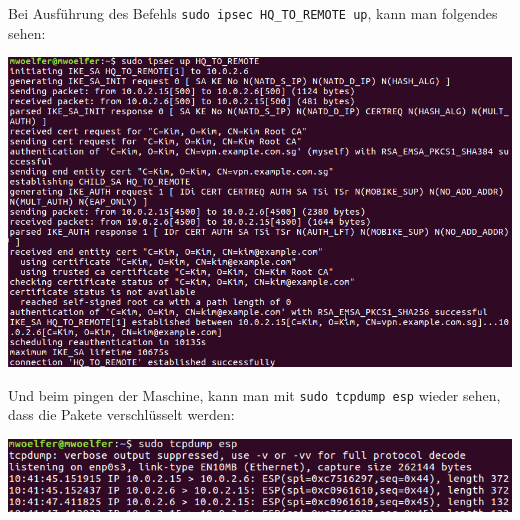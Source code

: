 Bei Ausführung des Befehls \verb|sudo ipsec HQ_TO_REMOTE up|, kann man folgendes sehen:

\begin{minipage}{\linewidth}
	\centering
	\includegraphics[width=0.8\linewidth]{images/ipsec_cert1}
\end{minipage}

Und beim pingen der Maschine, kann man mit \verb|sudo tcpdump esp| wieder sehen, dass die Pakete verschlüsselt werden:

\begin{minipage}{\linewidth}
	\centering
	\includegraphics[width=0.8\linewidth]{images/tcpdump2}
\end{minipage}